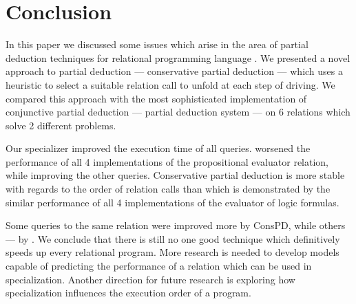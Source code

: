 \section{Conclusion}

In this paper we discussed some issues which arise in the area of partial deduction techniques for relational programming language \mk.
We presented a novel approach to partial deduction --- conservative partial deduction --- which uses a heuristic to select a suitable relation call to unfold at each step of driving.
We compared this approach with the most sophisticated implementation of conjunctive partial deduction --- \ecce partial deduction system --- on 6 relations which solve 2 different problems.

Our specializer improved the execution time of all queries.
\ecce worsened the performance of all 4 implementations of the propositional evaluator relation, while improving the other queries.
Conservative partial deduction is more stable with regards to the order of relation calls than \ecce which is demonstrated by the similar performance of all 4 implementations of the evaluator of logic formulas.

Some queries to the same relation were improved more by ConsPD, while others --- by \ecce.
We conclude that there is still no one good technique which definitively speeds up every relational program.
More research is needed to develop models capable of predicting the performance of a relation which can be used in specialization.
Another direction for future research is exploring how specialization influences the execution order of a \mk program.
